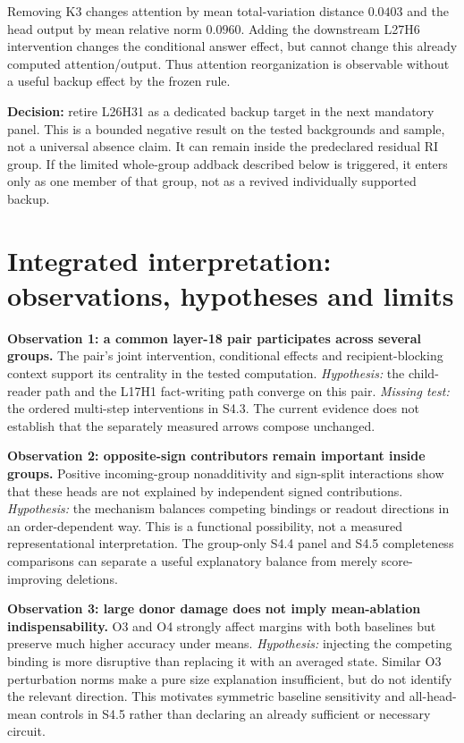 Removing K3 changes attention by mean total-variation distance $0.0403$ and the head output by mean relative norm $0.0960$. Adding the downstream L27H6 intervention changes the conditional answer effect, but cannot change this already computed attention/output. Thus attention reorganization is observable without a useful backup effect by the frozen rule.

\textbf{Decision:} retire L26H31 as a dedicated backup target in the next mandatory panel. This is a bounded negative result on the tested backgrounds and sample, not a universal absence claim. It can remain inside the predeclared residual RI group. If the limited whole-group addback described below is triggered, it enters only as one member of that group, not as a revived individually supported backup.
\FloatBarrier

\section{Integrated interpretation: observations, hypotheses and limits}
\label{sec:s42_interpretation}
\textbf{Observation 1: a common layer-18 pair participates across several groups.}
The pair's joint intervention, conditional effects and recipient-blocking context support its centrality in the tested computation. \emph{Hypothesis:} the child-reader path and the L17H1 fact-writing path converge on this pair. \emph{Missing test:} the ordered multi-step interventions in S4.3. The current evidence does not establish that the separately measured arrows compose unchanged.

\textbf{Observation 2: opposite-sign contributors remain important inside groups.}
Positive incoming-group nonadditivity and sign-split interactions show that these heads are not explained by independent signed contributions. \emph{Hypothesis:} the mechanism balances competing bindings or readout directions in an order-dependent way. This is a functional possibility, not a measured representational interpretation. The group-only S4.4 panel and S4.5 completeness comparisons can separate a useful explanatory balance from merely score-improving deletions.

\textbf{Observation 3: large donor damage does not imply mean-ablation indispensability.}
O3 and O4 strongly affect margins with both baselines but preserve much higher accuracy under means. \emph{Hypothesis:} injecting the competing binding is more disruptive than replacing it with an averaged state. Similar O3 perturbation norms make a pure size explanation insufficient, but do not identify the relevant direction. This motivates symmetric baseline sensitivity and all-head-mean controls in S4.5 rather than declaring an already sufficient or necessary circuit.

